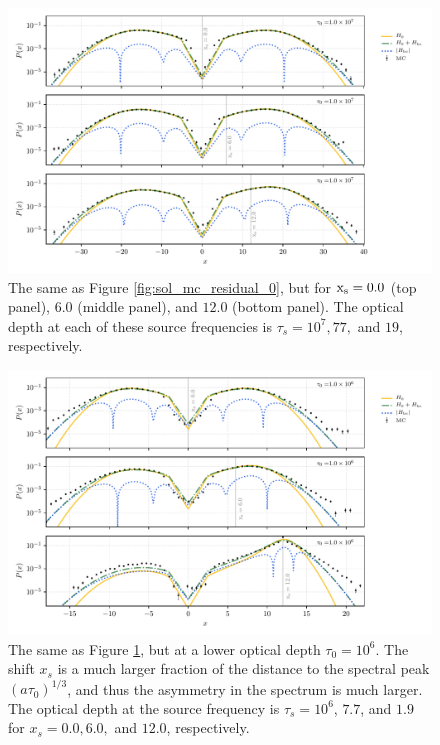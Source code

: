 \documentclass[linenumbers]{aastex63}
\begin{document}
 \begin{figure}
    \centering
    \includegraphics[width=\textwidth]{xinit_threepanel.pdf}
    \caption{The same as Figure \ref{fig:sol_mc_residual_0}, but for $\rm x_s = 0.0$ (top panel), $6.0$ (middle panel), and $12.0$ (bottom panel). The optical depth at each of these source frequencies is $\tau_s = 10^7, 77,$ and $19$, respectively.} 
    \label{fig:sol_mc_xinit}
\end{figure}

 \begin{figure}
    \centering
    \includegraphics[width=\textwidth]{xinit_threepanel_tau1e6.pdf}
    \caption{The same as Figure \ref{fig:sol_mc_xinit}, but at a lower optical depth $\tau_0 = 10^6$. The shift $x_s$ is a much larger fraction of the distance to the spectral peak $(a\tau_0)^{1/3}$, and thus the asymmetry in the spectrum is much larger. The optical depth at the source frequency is $\tau_s = 10^6$, $7.7$, and $1.9$ for $x_s=0.0, 6.0,$ and $12.0$, respectively. } 
    \label{fig:sol_mc_xinit_lowtau}
\end{figure}
\end{document}
